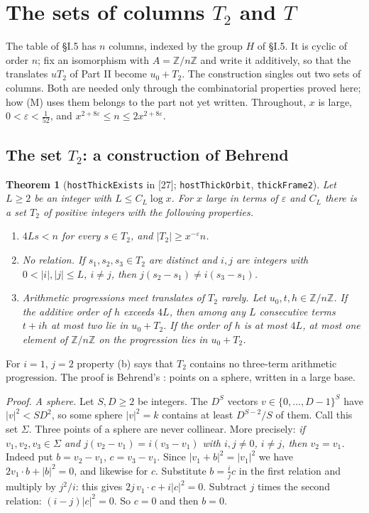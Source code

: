 \documentclass[11pt,letterpaper]{article}
\newtheorem{theorem}{Theorem}[section]
\newcommand{\Z}{\mathbb Z}\newcommand{\Q}{\mathbb Q}\newcommand{\C}{\mathbb C}
\begin{document}
\section{The sets of columns $T_2$ and $T$}

The table of \S I.5 has $n$ columns, indexed by the group $H$ of \S I.5. It is cyclic of order $n$; fix an isomorphism with $A=\Z/n\Z$ and write it
additively, so that the translates $uT_2$ of Part II become $u_0+T_2$. The construction singles out
two sets of columns. Both are needed only through the combinatorial properties proved here; how (M)
uses them belongs to the part not yet written. Throughout, $x$ is large, $0<\varepsilon<\frac1{52}$, and
$x^{2+8\varepsilon}\le n\le2x^{2+8\varepsilon}$.

\subsection*{The set $T_2$: a construction of Behrend}

\begin{theorem}[\texttt{hostThickExists} in {[27]}; \texttt{hostThickOrbit}, \texttt{thickFrame2}]\label{thm:T2}
Let $L\ge2$ be an integer with $L\le C_L\log x$. For $x$ large in terms of $\varepsilon$ and $C_L$ there is
a set $T_2$ of positive integers with the following properties.
\begin{enumerate}[label=\textup{(\alph*)},leftmargin=2.2em]
\item $4Ls<n$ for every $s\in T_2$, and $|T_2|\ge x^{-\varepsilon}n$.
\item \emph{No relation.} If $s_1,s_2,s_3\in T_2$ are distinct and $i,j$ are integers with $0<|i|,|j|\le L$,
$i\ne j$, then $j(s_2-s_1)\ne i(s_3-s_1)$.
\item \emph{Arithmetic progressions meet translates of $T_2$ rarely.} Let $u_0,t,h\in\Z/n\Z$. If the additive
order of $h$ exceeds $4L$, then among any $L$ consecutive terms $t+ih$ at most two lie in
$u_0+T_2$. If the order of $h$ is at most $4L$, at most one element of $\Z/n\Z$ on the progression lies in $u_0+T_2$.
\end{enumerate}
\end{theorem}

\noindent For $i=1$, $j=2$ property (b) says that $T_2$ contains no three-term arithmetic progression. The
proof is Behrend's \cite{Beh46}: points on a sphere, written in a large base.

\emph{Proof.} \emph{A sphere.} Let $S,D\ge2$ be integers. The $D^S$ vectors $v\in\{0,\dots,D-1\}^S$ have
$|v|^2<SD^2$, so some sphere $|v|^2=k$ contains at least $D^{S-2}/S$ of them. Call this set $\Sigma$. Three
points of a sphere are never collinear. More precisely: \emph{if $v_1,v_2,v_3\in\Sigma$ and
$j(v_2-v_1)=i(v_3-v_1)$ with $i,j\ne0$, $i\ne j$, then $v_2=v_1$.} Indeed put $b=v_2-v_1$, $c=v_3-v_1$. Since
$|v_1+b|^2=|v_1|^2$ we have $2v_1\cdot b+|b|^2=0$, and likewise for $c$. Substitute $b=\frac ijc$ in the first relation and multiply by $j^2/i$: this gives
$2j\,v_1\cdot c+i|c|^2=0$. Subtract $j$ times the second relation: $(i-j)|c|^2=0$. So $c=0$ and then $b=0$.
\end{document}
